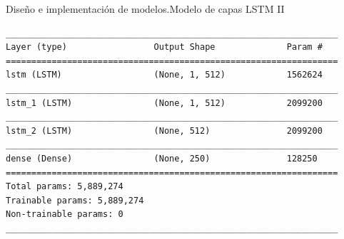 \begin{frame}[fragile]{Diseño e implementación de modelos.\newline Modelo de capas LSTM II}
\begin{lstlisting}[basicstyle=\tiny\ttfamily, caption={Resumen del modelo},captionpos=b, label={lst: model_resume},frame=none, xleftmargin=.2\textwidth]
_________________________________________________________________
Layer (type)                 Output Shape              Param #   
=================================================================
lstm (LSTM)                  (None, 1, 512)            1562624   
_________________________________________________________________
lstm_1 (LSTM)                (None, 1, 512)            2099200   
_________________________________________________________________
lstm_2 (LSTM)                (None, 512)               2099200   
_________________________________________________________________
dense (Dense)                (None, 250)               128250    
=================================================================
Total params: 5,889,274
Trainable params: 5,889,274
Non-trainable params: 0
_________________________________________________________________
\end{lstlisting}
\end{frame}
